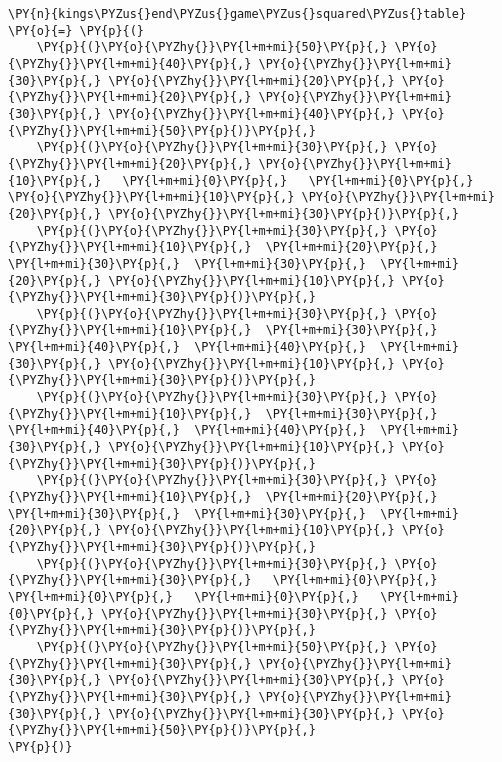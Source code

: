     \begin{tcolorbox}[fontupper=\linespread{.66}\selectfont, breakable, size=fbox, boxrule=1pt, pad at break*=1mm,colback=cellbackground, colframe=cellborder]
\begin{Verbatim}[commandchars=\\\{\}]
\PY{n}{kings\PYZus{}end\PYZus{}game\PYZus{}squared\PYZus{}table} \PY{o}{=} \PY{p}{(}
    \PY{p}{(}\PY{o}{\PYZhy{}}\PY{l+m+mi}{50}\PY{p}{,} \PY{o}{\PYZhy{}}\PY{l+m+mi}{40}\PY{p}{,} \PY{o}{\PYZhy{}}\PY{l+m+mi}{30}\PY{p}{,} \PY{o}{\PYZhy{}}\PY{l+m+mi}{20}\PY{p}{,} \PY{o}{\PYZhy{}}\PY{l+m+mi}{20}\PY{p}{,} \PY{o}{\PYZhy{}}\PY{l+m+mi}{30}\PY{p}{,} \PY{o}{\PYZhy{}}\PY{l+m+mi}{40}\PY{p}{,} \PY{o}{\PYZhy{}}\PY{l+m+mi}{50}\PY{p}{)}\PY{p}{,}
    \PY{p}{(}\PY{o}{\PYZhy{}}\PY{l+m+mi}{30}\PY{p}{,} \PY{o}{\PYZhy{}}\PY{l+m+mi}{20}\PY{p}{,} \PY{o}{\PYZhy{}}\PY{l+m+mi}{10}\PY{p}{,}   \PY{l+m+mi}{0}\PY{p}{,}   \PY{l+m+mi}{0}\PY{p}{,} \PY{o}{\PYZhy{}}\PY{l+m+mi}{10}\PY{p}{,} \PY{o}{\PYZhy{}}\PY{l+m+mi}{20}\PY{p}{,} \PY{o}{\PYZhy{}}\PY{l+m+mi}{30}\PY{p}{)}\PY{p}{,}
    \PY{p}{(}\PY{o}{\PYZhy{}}\PY{l+m+mi}{30}\PY{p}{,} \PY{o}{\PYZhy{}}\PY{l+m+mi}{10}\PY{p}{,}  \PY{l+m+mi}{20}\PY{p}{,}  \PY{l+m+mi}{30}\PY{p}{,}  \PY{l+m+mi}{30}\PY{p}{,}  \PY{l+m+mi}{20}\PY{p}{,} \PY{o}{\PYZhy{}}\PY{l+m+mi}{10}\PY{p}{,} \PY{o}{\PYZhy{}}\PY{l+m+mi}{30}\PY{p}{)}\PY{p}{,}
    \PY{p}{(}\PY{o}{\PYZhy{}}\PY{l+m+mi}{30}\PY{p}{,} \PY{o}{\PYZhy{}}\PY{l+m+mi}{10}\PY{p}{,}  \PY{l+m+mi}{30}\PY{p}{,}  \PY{l+m+mi}{40}\PY{p}{,}  \PY{l+m+mi}{40}\PY{p}{,}  \PY{l+m+mi}{30}\PY{p}{,} \PY{o}{\PYZhy{}}\PY{l+m+mi}{10}\PY{p}{,} \PY{o}{\PYZhy{}}\PY{l+m+mi}{30}\PY{p}{)}\PY{p}{,}
    \PY{p}{(}\PY{o}{\PYZhy{}}\PY{l+m+mi}{30}\PY{p}{,} \PY{o}{\PYZhy{}}\PY{l+m+mi}{10}\PY{p}{,}  \PY{l+m+mi}{30}\PY{p}{,}  \PY{l+m+mi}{40}\PY{p}{,}  \PY{l+m+mi}{40}\PY{p}{,}  \PY{l+m+mi}{30}\PY{p}{,} \PY{o}{\PYZhy{}}\PY{l+m+mi}{10}\PY{p}{,} \PY{o}{\PYZhy{}}\PY{l+m+mi}{30}\PY{p}{)}\PY{p}{,}
    \PY{p}{(}\PY{o}{\PYZhy{}}\PY{l+m+mi}{30}\PY{p}{,} \PY{o}{\PYZhy{}}\PY{l+m+mi}{10}\PY{p}{,}  \PY{l+m+mi}{20}\PY{p}{,}  \PY{l+m+mi}{30}\PY{p}{,}  \PY{l+m+mi}{30}\PY{p}{,}  \PY{l+m+mi}{20}\PY{p}{,} \PY{o}{\PYZhy{}}\PY{l+m+mi}{10}\PY{p}{,} \PY{o}{\PYZhy{}}\PY{l+m+mi}{30}\PY{p}{)}\PY{p}{,}
    \PY{p}{(}\PY{o}{\PYZhy{}}\PY{l+m+mi}{30}\PY{p}{,} \PY{o}{\PYZhy{}}\PY{l+m+mi}{30}\PY{p}{,}   \PY{l+m+mi}{0}\PY{p}{,}   \PY{l+m+mi}{0}\PY{p}{,}   \PY{l+m+mi}{0}\PY{p}{,}   \PY{l+m+mi}{0}\PY{p}{,} \PY{o}{\PYZhy{}}\PY{l+m+mi}{30}\PY{p}{,} \PY{o}{\PYZhy{}}\PY{l+m+mi}{30}\PY{p}{)}\PY{p}{,}
    \PY{p}{(}\PY{o}{\PYZhy{}}\PY{l+m+mi}{50}\PY{p}{,} \PY{o}{\PYZhy{}}\PY{l+m+mi}{30}\PY{p}{,} \PY{o}{\PYZhy{}}\PY{l+m+mi}{30}\PY{p}{,} \PY{o}{\PYZhy{}}\PY{l+m+mi}{30}\PY{p}{,} \PY{o}{\PYZhy{}}\PY{l+m+mi}{30}\PY{p}{,} \PY{o}{\PYZhy{}}\PY{l+m+mi}{30}\PY{p}{,} \PY{o}{\PYZhy{}}\PY{l+m+mi}{30}\PY{p}{,} \PY{o}{\PYZhy{}}\PY{l+m+mi}{50}\PY{p}{)}\PY{p}{,}
\PY{p}{)}
\end{Verbatim}
\end{tcolorbox}

